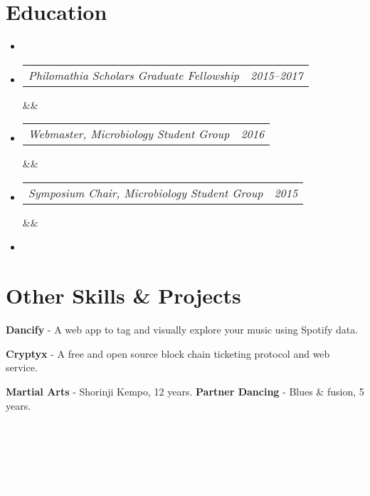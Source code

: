 \documentclass[11pt,letterpaper,sans]{moderncv}        %
\makeatletter
\newcommand*{\cvsimple}[4][.25em]{
  \begin{tabular*}{\maincolumnwidth}{l@{\extracolsep{\fill}}r}%
    {\itshape #3} & {\itshape #2}\\%
  \end{tabular*}%
  \ifx&#4&%
  \else{\\%
    \begin{minipage}{\maincolumnwidth}%
      \small#4%
    \end{minipage}}\fi%
  \par\addvspace{#1}}
\makeatother
\begin{document}
\pagebreak

\section{Education}
\begin{itemize}

\vspace{5pt}
\item{}
\item[]{\cvsimple{2015--2017}{Philomathia Scholars Graduate Fellowship}{}}
\item[]{\cvsimple{2016}{Webmaster, Microbiology Student Group}{}}
\item[]{\cvsimple{2015}{Symposium Chair, Microbiology Student Group}{}}
  
\vspace{5pt}
\item{}

\end{itemize}

\nocite{*} %

{\small  } %

\section{Other Skills \& Projects}

\begin{multicols}{3}

  \textbf{Dancify} - A web app to tag and visually explore your music using Spotify data.
  \newline
  \newline
  
  \textbf{Cryptyx} - A free and open source block chain ticketing protocol and web service.
  \newline
  \newline
  
  \textbf{Martial Arts} - Shorinji Kempo, 12 years.
  \newline
  \textbf{Partner Dancing} - Blues \& fusion, 5 years.

\end{multicols}

\textcolor{white}{\tiny \textsuperscript{analyze data analysis visualization genetics algorithms statistics unsupervised learning markov models classification data mining bioinformatics informatics biostatistics computational biology datasets} }

\textcolor{white}{\tiny \textsuperscript{computer science version control written communication skills interpersonal skills verbal communication skills collaborate collaborative project independent project driven} }
\end{document}
